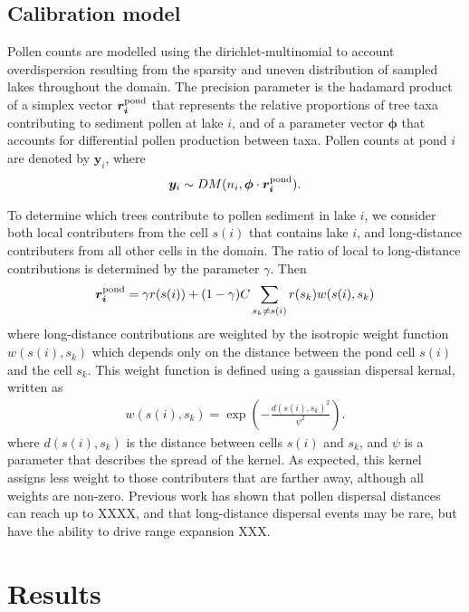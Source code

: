 \documentclass[12pt]{article}
\begin{document}
\subsection{Calibration model}

Pollen counts are modelled using the dirichlet-multinomial to account overdispersion resulting from the sparsity and uneven distribution of sampled lakes throughout the domain. The precision parameter is the hadamard product of a simplex vector $\bm{r^{\textup{pond}}_i}$ that represents the relative proportions of tree taxa contributing to sediment pollen at lake $i$, and of a parameter vector $\bm{\phi}$ that accounts for differential pollen production between taxa. Pollen counts at pond $i$ are denoted by  $\bm{y}_i$, where 
\begin{align}
\bm{y}_i \sim DM (n_i, \bm{\phi} \cdot \bm{r^{\textup{pond}}_i}).
\label{eq:DM}
\end{align}

To determine which trees contribute to pollen sediment in lake $i$, we consider both local contributers from the cell $s(i)$ that contains lake $i$, and long-distance contributers from all other cells in the domain. The ratio of local to long-distance contributions is determined by the parameter $\gamma$. Then
\begin{align}
\bm{r^{\textup{pond}}_i} = \gamma r(s(i)) + (1-\gamma) C \sum_{s_k \neq s(i) } r(s_k) w(s(i), s_k)
\end{align}
where long-distance contributions are weighted by the isotropic weight function $w(s(i), s_k)$ which depends only on the distance between the pond cell $s(i)$ and the cell $s_k$. This weight function is defined using a gaussian dispersal kernal, written as
\begin{align}
w(s(i), s_k) = \exp\left( - \frac{d(s(i), s_k)^2}{\psi^2} \right).
\end{align}
where $d(s(i),s_k)$ is the distance between cells $s(i)$ and $s_k$, and $\psi$ is a parameter that describes the spread of the kernel. As expected, this kernel assigns less weight to those contributers that are farther away, although all weights are non-zero. Previous work has shown that pollen dispersal distances can reach up to XXXX, and that long-distance dispersal events may be rare, but have the ability to drive range expansion XXX. 



\section{Results}
\end{document}
